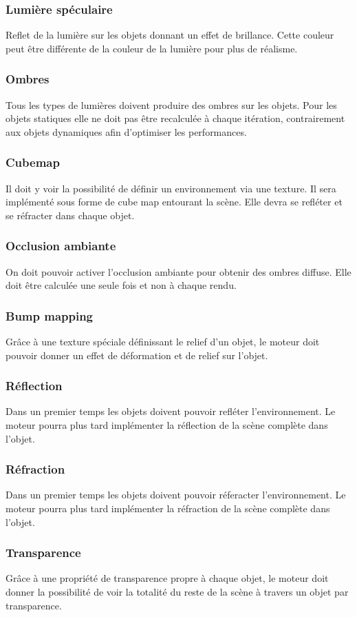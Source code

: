 \documentclass [a4 paper,11pt]{article}
\begin{document}
\subsubsection*{Lumière spéculaire}
Reflet de la lumière sur les objets donnant un effet de brillance. Cette couleur peut être différente de la couleur de la lumière pour plus de réalisme.
\subsubsection*{Ombres}
Tous les types de lumières doivent produire des ombres sur les objets. 
Pour les objets statiques elle ne doit pas être recalculée à chaque itération, contrairement aux objets dynamiques afin d'optimiser les performances.
\subsubsection*{Cubemap}
Il doit y voir la possibilité de définir un environnement via une texture. 
Il sera implémenté sous forme de cube map entourant la scène.
Elle devra se refléter et se réfracter dans chaque objet.
\subsubsection*{Occlusion ambiante}
On doit pouvoir activer l'occlusion ambiante pour obtenir des ombres diffuse.
Elle doit être calculée une seule fois et non à chaque rendu.
\subsubsection*{Bump mapping}
Grâce à une texture spéciale définissant le relief d'un objet, le moteur doit pouvoir donner un effet de déformation et de relief sur l'objet.
\subsubsection*{Réflection}
Dans un premier temps les objets doivent pouvoir refléter l'environnement.
Le moteur pourra plus tard implémenter la réflection de la scène complète dans l'objet.
\subsubsection*{Réfraction}
Dans un premier temps les objets doivent pouvoir réferacter l'environnement.
Le moteur pourra plus tard implémenter la réfraction de la scène complète dans l'objet.
\subsubsection*{Transparence}
Grâce à une propriété de transparence propre à chaque objet, le moteur doit donner la possibilité de voir la totalité du reste de la scène à travers un objet par transparence.
\end{document}
